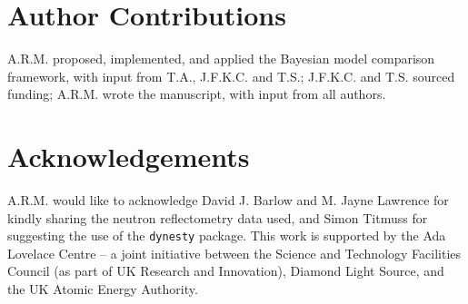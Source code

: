 \documentclass[
 reprint,
 superscriptaddress,
 amsmath,amssymb,
 aps,
]{revtex4-2}
\begin{document}
\section*{Author Contributions}

A.R.M. proposed, implemented, and applied the Bayesian model comparison framework, with input from T.A., J.F.K.C. and T.S.; J.F.K.C. and T.S. sourced funding; A.R.M. wrote the manuscript, with input from all authors.

\section*{Acknowledgements}

A.R.M. would like to acknowledge David J. Barlow and M. Jayne Lawrence for kindly sharing the neutron reflectometry data used, and Simon Titmuss for suggesting the use of the \texttt{dynesty} package.
This work is supported by the Ada Lovelace Centre – a joint initiative between the Science and Technology Facilities Council (as part of UK Research and Innovation), Diamond Light Source, and the UK Atomic Energy Authority.



\end{document}
